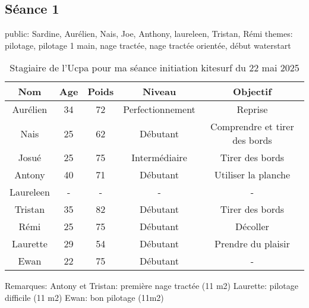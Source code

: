 \documentclass[12pt,a4paper]{report}
\begin{document}
\subsection{Séance 1}
public: Sardine, Aurélien, Nais, Joe, Anthony, laureleen, Tristan, Rémi
themes: pilotage, pilotage 1 main, nage tractée, nage tractée orientée, début waterstart
\begin{table}
\begin{tabular}{|c|c|c|c|c|}
        \hline
        \textbf{Nom} & \textbf{Age} & \textbf{Poids}& \textbf{Niveau}     &  \textbf{Objectif} \\ 
        \hline
        Aurélien      &  34          &  72           &   Perfectionnement  & Reprise \\
        Nais          &  25          &  62           &   Débutant          & Comprendre et tirer des bords \\
        Josué         &  25          &  75           &   Intermédiaire     & Tirer des bords \\
        Antony        &  40          &  71           &   Débutant          & Utiliser la planche  \\
        Laureleen     &  -           &  -            &   -                 &   -  \\
        Tristan       &  35          & 82            &  Débutant           & Tirer des bords  \\
        Rémi          &  25          & 75            &  Débutant           &  Décoller  \\
        Laurette      &  29          & 54            &  Débutant           & Prendre du plaisir \\
        Ewan          &  22          & 75            & Débutant            &  -  \\
        \hline
\end{tabular}
\caption{Stagiaire de l'Ucpa pour ma séance initiation kitesurf du 22 mai 2025}
\end{table}

Remarques: Antony et Tristan: première nage tractée (11 m2)
Laurette: pilotage difficile  (11 m2)
Ewan: bon pilotage  (11m2)
\end{document}
